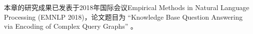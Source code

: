 %


本章的研究成果已发表于2018年国际会议Empirical Methods in Natural Language Processing
(EMNLP 2018)，论文题目为
``Knowledge Base Question Answering via Encoding of Complex Query Graphs'' 。
